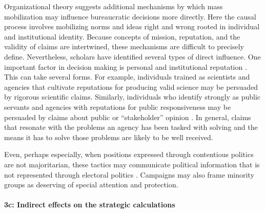 
Organizational theory suggests additional mechanisms by which mass mobilization may influence bureaucratic decisions more directly. Here the causal process involves mobilizing norms and ideas right and wrong rooted in individual and institutional identity. Because concepts of mission, reputation, and the validity of claims are intertwined, these mechanisms are difficult to precisely define. Nevertheless, scholars have identified several types of direct influence. One important factor in decision making is personal and institutional reputation \citep{Carpenter2001}. This can take several forms. For example, individuals trained as scientists and agencies that cultivate reputations for producing valid science may be persuaded by rigorous scientific claims. Similarly, individuals who identify strongly as public servants and agencies with reputations for public responsiveness may be persuaded by claims about public or ``stakeholder'' opinion \citep{Meier2006}. In general, claims that resonate with the problems an agency has been tasked with solving and the means it has to solve those problems are likely to be well received. 

Even, perhaps especially, when positions expressed through contentious politics
are not majoritarian, these tactics may communicate political information that is not represented through electoral politics \citep{Gillion2012, Gillion2013}. 
Campaigns may also frame minority groups as deserving of special attention and protection.





\paragraph{3c: Indirect effects on the strategic calculations}

